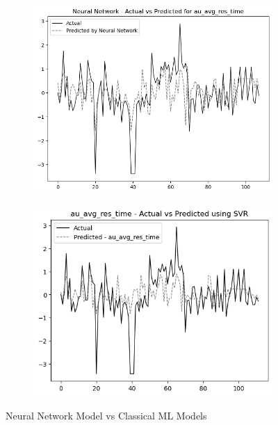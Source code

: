 \begin{figure}
    \begin{subfigure}[b]{0.49\textwidth}
        \centering
        \includegraphics[width=\linewidth]{images/nnCharts/all_data_audio_avg_response_time.png}
    \end{subfigure}\hfill
    \begin{subfigure}[b]{0.49\textwidth}
        \centering
        \includegraphics[width=\linewidth]{images/regressionCharts/all_data_audio_average_response_time.png}
    \end{subfigure}
    
    \caption{Neural Network Model vs Classical ML Models}
    \label{fig:nn_comparison}
\end{figure}



